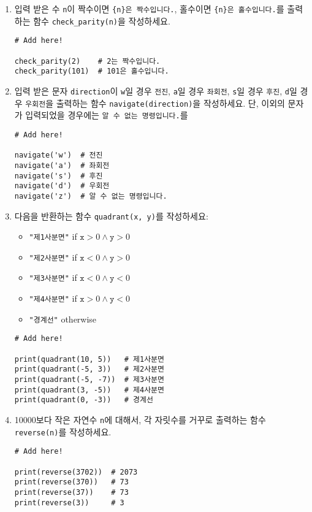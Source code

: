\documentclass[../main.tex]{subfiles}
\begin{document}
\begin{enumerate}
\item 입력 받은 수 \verb|n|이 짝수이면 \verb|{n}은 짝수입니다.|, 홀수이면
  \verb|{n}은 홀수입니다.|를 출력하는 함수 \verb|check_parity(n)|을 작성하세요.
\begin{verbatim}
# Add here!

check_parity(2)    # 2는 짝수입니다.
check_parity(101)  # 101은 홀수입니다.
\end{verbatim}

\item 입력 받은 문자 \verb|direction|이 \verb|w|일 경우 \verb|전진|,
  \verb|a|일 경우 \verb|좌회전|, \verb|s|일 경우 \verb|후진|, \verb|d|일 경우
  \verb|우회전|을 출력하는 함수 \verb|navigate(direction)|을 작성하세요.
  단, 이외의 문자가 입력되었을 경우에는 \verb|알 수 없는 명령입니다.|를
 \begin{verbatim}
# Add here!

navigate('w')  # 전진
navigate('a')  # 좌회전
navigate('s')  # 후진
navigate('d')  # 우회전
navigate('z')  # 알 수 없는 명령입니다.
\end{verbatim}

\item 다음을 반환하는 함수 \texttt{quadrant(x, y)}를 작성하세요:
\begin{itemize}
  \item \texttt{"제1사분면"} if $\texttt{x} > 0 \wedge \texttt{y} > 0$
  \item \texttt{"제2사분면"} if $\texttt{x} < 0 \wedge \texttt{y} > 0$
  \item \texttt{"제3사분면"} if $\texttt{x} < 0 \wedge \texttt{y} < 0$
  \item \texttt{"제4사분면"} if $\texttt{x} > 0 \wedge \texttt{y} < 0$
\item \texttt{"경계선"} otherwise
\end{itemize}
\begin{verbatim}
# Add here!

print(quadrant(10, 5))   # 제1사분면
print(quadrant(-5, 3))   # 제2사분면
print(quadrant(-5, -7))  # 제3사분면
print(quadrant(3, -5))   # 제4사분면
print(quadrant(0, -3))   # 경계선
\end{verbatim}

\item 10000보다 작은 자연수 \texttt{n}에 대해서, 각 자릿수를 거꾸로 출력하는
  함수 \texttt{reverse(n)}를 작성하세요.
\begin{verbatim}
# Add here!

print(reverse(3702))  # 2073
print(reverse(370))   # 73
print(reverse(37))    # 73
print(reverse(3))     # 3
\end{verbatim}


\end{enumerate}
\end{document}
